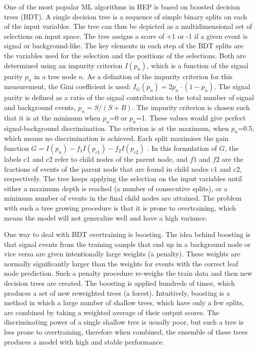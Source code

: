One of the most popular ML algorithms in HEP is based on boosted decision trees (BDT). A single decision tree is a sequence of simple binary splits on each of the input variables. The tree can thus be depicted as a multidimensional set of selections on input space. The tree assigns a score of +1 or -1 if a given event is signal or background-like. The key elements in each step of the BDT splits are the variables used for the selection and the positions of the selections. Both are determined using an impurity criterion $I(p_n)$, which is a function of the signal purity $p_n$ in a tree node $n$. As a definition of the impurity criterion for this measurement, the Gini coefficient is used: $I_G(p_n) = 2 p_n \cdot (1 - p_n)$. The signal purity is defined as a ratio of the signal contribution to the total number of signal and background events, $p_n = S/(S+B)$. The impurity criterion is chosen such that it is at the minimum when $p_n$=0 or $p_n$=1. These values would give perfect signal-background discrimination. The criterion is at the maximum, when $p_n$=0.5, which means no discrimination is achieved. 
Each split maximises the gain function $G=I(p_n) - f_1I(p_{c1})-f_2I(p_{c2})$ . In this formulation of $G$, the labels c1 and c2 refer to child nodes of the parent node, and $f1$ and $f2$ are the fractions of events of the parent node that are found in child nodes c1 and c2, respectively. 
The tree keeps applying the selection on the input variables until either a maximum depth is reached (a number of consecutive splits), or a minimum number of events in the final child nodes are attained. The problem with such a tree growing procedure is that it is prone to overtraining, which means the model will not generalize well and have a high variance. 

One way to deal with BDT overtraining is boosting. The idea behind boosting is that signal events from the training sample that end up in a background node or vice versa are given intentionally large weights (a penalty). These weights are normally significantly larger than the weights for events with the correct leaf node prediction. Such a penalty procedure re-weighs the train data and then new decision trees are created. The boosting is applied hundreds of times, which produces a set of new reweighted trees (a forest). Intuitively, boosting is a method in which a large number of shallow trees, which have only a few splits, are combined by taking a weighted average of their output scores. The discriminating power of a single shallow tree is usually poor, but such a tree is less prone to overtraining, therefore when combined, the ensemble of these trees produces a model with high and stable performance.


